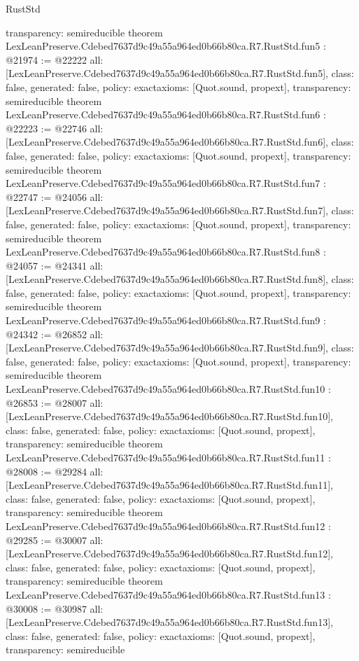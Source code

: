 \begin{lexlean}{RustStd}
\begin{coremodule}
{  transparency: semireducible
}
theorem LexLeanPreserve.Cdebed7637d9c49a55a964ed0b66b80ca.R7.RustStd.fun5 : @21974 := @22222 {
  all: [LexLeanPreserve.Cdebed7637d9c49a55a964ed0b66b80ca.R7.RustStd.fun5],
  class: false,
  generated: false,
  policy: exact{axioms: [Quot.sound, propext]},
  transparency: semireducible
}
theorem LexLeanPreserve.Cdebed7637d9c49a55a964ed0b66b80ca.R7.RustStd.fun6 : @22223 := @22746 {
  all: [LexLeanPreserve.Cdebed7637d9c49a55a964ed0b66b80ca.R7.RustStd.fun6],
  class: false,
  generated: false,
  policy: exact{axioms: [Quot.sound, propext]},
  transparency: semireducible
}
theorem LexLeanPreserve.Cdebed7637d9c49a55a964ed0b66b80ca.R7.RustStd.fun7 : @22747 := @24056 {
  all: [LexLeanPreserve.Cdebed7637d9c49a55a964ed0b66b80ca.R7.RustStd.fun7],
  class: false,
  generated: false,
  policy: exact{axioms: [Quot.sound, propext]},
  transparency: semireducible
}
theorem LexLeanPreserve.Cdebed7637d9c49a55a964ed0b66b80ca.R7.RustStd.fun8 : @24057 := @24341 {
  all: [LexLeanPreserve.Cdebed7637d9c49a55a964ed0b66b80ca.R7.RustStd.fun8],
  class: false,
  generated: false,
  policy: exact{axioms: [Quot.sound, propext]},
  transparency: semireducible
}
theorem LexLeanPreserve.Cdebed7637d9c49a55a964ed0b66b80ca.R7.RustStd.fun9 : @24342 := @26852 {
  all: [LexLeanPreserve.Cdebed7637d9c49a55a964ed0b66b80ca.R7.RustStd.fun9],
  class: false,
  generated: false,
  policy: exact{axioms: [Quot.sound, propext]},
  transparency: semireducible
}
theorem LexLeanPreserve.Cdebed7637d9c49a55a964ed0b66b80ca.R7.RustStd.fun10 : @26853 := @28007 {
  all: [LexLeanPreserve.Cdebed7637d9c49a55a964ed0b66b80ca.R7.RustStd.fun10],
  class: false,
  generated: false,
  policy: exact{axioms: [Quot.sound, propext]},
  transparency: semireducible
}
theorem LexLeanPreserve.Cdebed7637d9c49a55a964ed0b66b80ca.R7.RustStd.fun11 : @28008 := @29284 {
  all: [LexLeanPreserve.Cdebed7637d9c49a55a964ed0b66b80ca.R7.RustStd.fun11],
  class: false,
  generated: false,
  policy: exact{axioms: [Quot.sound, propext]},
  transparency: semireducible
}
theorem LexLeanPreserve.Cdebed7637d9c49a55a964ed0b66b80ca.R7.RustStd.fun12 : @29285 := @30007 {
  all: [LexLeanPreserve.Cdebed7637d9c49a55a964ed0b66b80ca.R7.RustStd.fun12],
  class: false,
  generated: false,
  policy: exact{axioms: [Quot.sound, propext]},
  transparency: semireducible
}
theorem LexLeanPreserve.Cdebed7637d9c49a55a964ed0b66b80ca.R7.RustStd.fun13 : @30008 := @30987 {
  all: [LexLeanPreserve.Cdebed7637d9c49a55a964ed0b66b80ca.R7.RustStd.fun13],
  class: false,
  generated: false,
  policy: exact{axioms: [Quot.sound, propext]},
  transparency: semireducible
}
\end{coremodule}
\end{lexlean}
